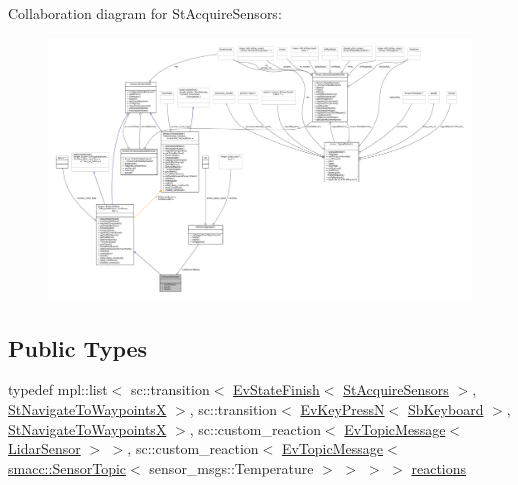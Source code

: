 Collaboration diagram for St\+Acquire\+Sensors\+:
\nopagebreak
\begin{figure}[H]
\begin{center}
\leavevmode
\includegraphics[width=350pt]{structStAcquireSensors__coll__graph}
\end{center}
\end{figure}
\subsection*{Public Types}
\begin{DoxyCompactItemize}
\item 
typedef mpl\+::list$<$ sc\+::transition$<$ \hyperlink{structsmacc_1_1EvStateFinish}{Ev\+State\+Finish}$<$ \hyperlink{structStAcquireSensors}{St\+Acquire\+Sensors} $>$, \hyperlink{structStNavigateToWaypointsX}{St\+Navigate\+To\+WaypointsX} $>$, sc\+::transition$<$ \hyperlink{structsmacc_1_1EvKeyPressN}{Ev\+Key\+PressN}$<$ \hyperlink{classsmacc_1_1SbKeyboard}{Sb\+Keyboard} $>$, \hyperlink{structStNavigateToWaypointsX}{St\+Navigate\+To\+WaypointsX} $>$, sc\+::custom\+\_\+reaction$<$ \hyperlink{structsmacc_1_1EvTopicMessage}{Ev\+Topic\+Message}$<$ \hyperlink{sensor__state_8h_a9db9e1944f88de79507758d08e4a2ee3}{Lidar\+Sensor} $>$ $>$, sc\+::custom\+\_\+reaction$<$ \hyperlink{structsmacc_1_1EvTopicMessage}{Ev\+Topic\+Message}$<$ \hyperlink{classsmacc_1_1SensorTopic}{smacc\+::\+Sensor\+Topic}$<$ sensor\+\_\+msgs\+::\+Temperature $>$ $>$ $>$ $>$ \hyperlink{structStAcquireSensors_a2e405e02a34cab31c6c05351e092e235}{reactions}
\end{DoxyCompactItemize}
